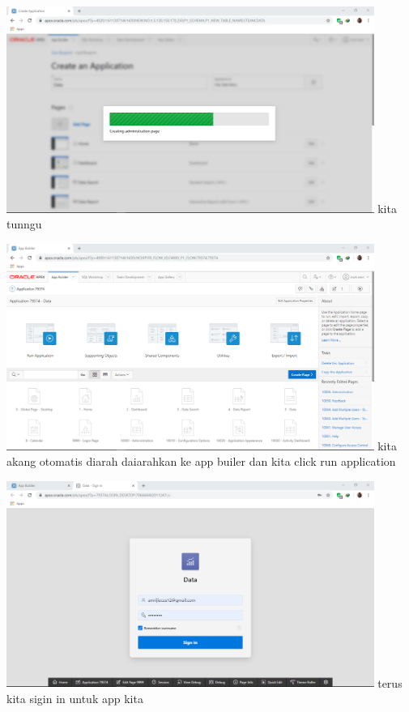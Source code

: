 \documentclass[12pt, times news roman, a4paper] {article}
\begin{document}
\begin{minipage}{\linewidth}
	\centering
	\includegraphics[width=12cm]{Gambar9.png} 
	 {kita tunngu}
\end{minipage}

\begin{minipage}{\linewidth}
	\centering
	\includegraphics[width=12cm]{Gambar10.png} 
	 {kita akang otomatis diarah daiarahkan ke app builer dan kita click run application }
\end{minipage}

\begin{minipage}{\linewidth}
	\centering
	\includegraphics[width=12cm]{Gambar11.png} 
	 {terus kita sigin in untuk app kita }
\end{minipage}
\end{document}
